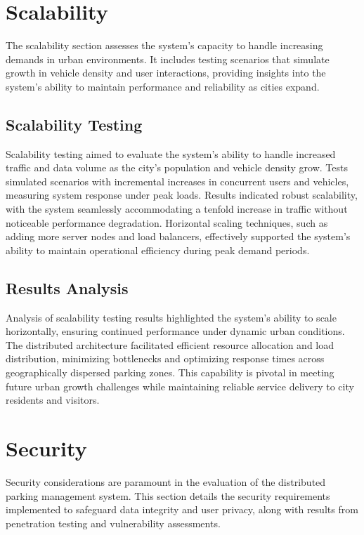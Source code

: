 \documentclass[oneside, 12pt, a4paper, draft]{book}
\begin{document}
\chapter{Scalability}
\label{sec:org202672b}
The scalability section assesses the system's capacity to handle increasing demands in urban environments. It includes testing scenarios that simulate growth in vehicle density and user interactions, providing insights into the system's ability to maintain performance and reliability as cities expand.
\section{Scalability Testing}
\label{sec:orga27dc69}

Scalability testing aimed to evaluate the system's ability to handle increased traffic and data volume as the city's population and vehicle density grow. Tests simulated scenarios with incremental increases in concurrent users and vehicles, measuring system response under peak loads. Results indicated robust scalability, with the system seamlessly accommodating a tenfold increase in traffic without noticeable performance degradation. Horizontal scaling techniques, such as adding more server nodes and load balancers, effectively supported the system's ability to maintain operational efficiency during peak demand periods.
\section{Results Analysis}
\label{sec:org12fd4e9}

Analysis of scalability testing results highlighted the system's ability to scale horizontally, ensuring continued performance under dynamic urban conditions. The distributed architecture facilitated efficient resource allocation and load distribution, minimizing bottlenecks and optimizing response times across geographically dispersed parking zones. This capability is pivotal in meeting future urban growth challenges while maintaining reliable service delivery to city residents and visitors.
\chapter{Security}
\label{sec:org2f0cdec}
Security considerations are paramount in the evaluation of the distributed parking management system. This section details the security requirements implemented to safeguard data integrity and user privacy, along with results from penetration testing and vulnerability assessments.
\end{document}
